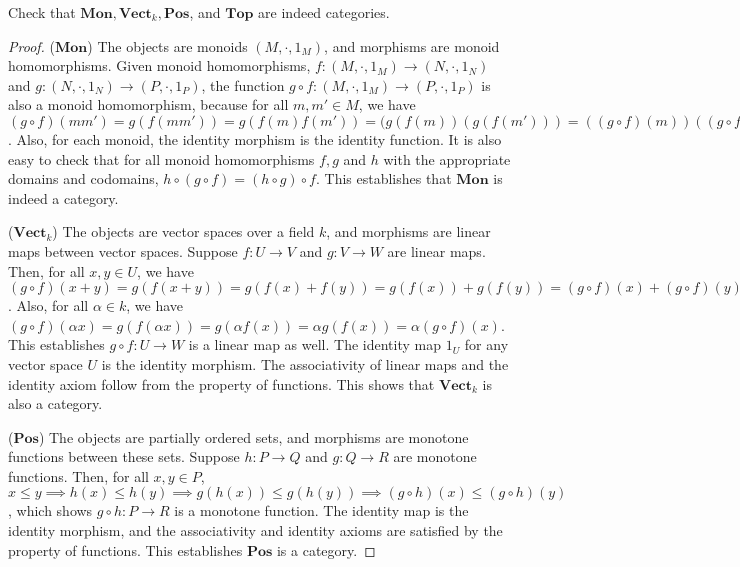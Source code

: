 \documentclass[]{amsbook}
\newcommand{\catname}[1]{\mathbf{#1}}
\begin{document}
\begin{Exercise}
	Check that $\catname{Mon}, \catname{Vect}_k, \catname{Pos}$, and
	$\catname{Top}$ are indeed categories.
\end{Exercise}
\begin{proof}
	($\catname{Mon}$) The objects are monoids $(M, \cdot, 1_M)$, and morphisms
	are monoid homomorphisms. Given monoid homomorphisms, $f: (M, \cdot, 1_M)
	\to (N, \cdot, 1_N)$ and $g: (N, \cdot, 1_N) \to (P, \cdot, 1_P)$, the
	function $g \circ f: (M, \cdot, 1_M) \to (P, \cdot, 1_P)$ is also a monoid
	homomorphism, because for all $m, m' \in M$, we have $(g \circ f)(m m') =
	g(f(m m')) = g(f(m) f(m')) = (g(f(m)) (g(f(m'))) = ((g \circ f)(m))
	((g \circ f)(m'))$. Also, for each monoid, the identity morphism is the
	identity function. It is also easy to check that for all monoid
	homomorphisms $f, g$ and $h$ with the appropriate domains and codomains,
	$h \circ (g \circ f) = (h \circ g) \circ f$. This establishes that
	$\catname{Mon}$ is indeed a category.

	($\catname{Vect}_k$) The objects are vector spaces over a field $k$, and
	morphisms are linear maps between vector spaces. Suppose $f: U \to V$ and
	$g: V \to W$ are linear maps. Then, for all $x, y \in U$, we have
	$(g \circ f)(x + y) = g(f(x + y)) = g(f(x) + f(y)) = g(f(x)) + g (f(y)) =
	(g \circ f)(x) + (g \circ f)(y)$. Also, for all $\alpha \in k$, we have
	$(g \circ f)(\alpha x) = g(f(\alpha x)) = g(\alpha f(x)) = \alpha g(f(x))
	= \alpha (g \circ f)(x)$. This establishes $g \circ f: U \to W$ is a
	linear map as well. The identity map $1_U$ for any vector space $U$ is the
	identity morphism. The associativity of linear maps and the identity axiom
	follow from the	property of functions. This shows that $\catname{Vect}_k$
	is also a category.

    ($\catname{Pos}$) The objects are partially ordered sets, and morphisms
    are monotone functions between these sets. Suppose $h: P \to Q$ and
    $g: Q \to R$ are monotone functions. Then, for all $x, y \in P$,
    $x \le y \implies h(x) \le h(y) \implies g(h(x)) \le g(h(y)) \implies
    (g \circ h)(x) \le (g \circ h)(y)$, which shows $g \circ h: P \to R$ is
    a monotone function. The identity map is the identity morphism, and the
    associativity and identity axioms are satisfied by the property of
    functions. This establishes $\catname{Pos}$ is a category.


\end{proof}
\end{document}

